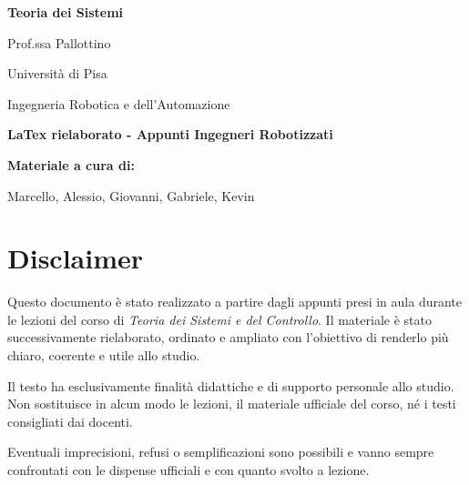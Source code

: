 \documentclass[a4paper,12pt]{report}
\theoremstyle{definition}
\begin{document}
\begin{titlepage}
    \centering
    \vspace*{2cm}

    {\Huge\bfseries Teoria dei Sistemi \par}
    \vspace{0.8cm}

    {\Large Prof.ssa Pallottino \par}
    \vspace{0.5cm}

    {\large Università di Pisa\par}
    \vspace{0.3cm}

    {\large Ingegneria Robotica e dell'Automazione\par}

    \vfill

    {\Large\bfseries LaTex rielaborato - Appunti Ingegneri Robotizzati\par}
    \vspace{0.8cm}

    {\large\textbf{Materiale a cura di:}\par}
    \vspace{0.2cm}
    {\large Marcello, Alessio, Giovanni, Gabriele, Kevin\par}

    \vfill
\end{titlepage}

\chapter*{Disclaimer}

Questo documento è stato realizzato a partire dagli appunti presi in aula durante le lezioni del corso di \emph{Teoria dei Sistemi e del Controllo}.  
Il materiale è stato successivamente rielaborato, ordinato e ampliato con l'obiettivo di renderlo più chiaro, coerente e utile allo studio.

Il testo ha esclusivamente finalità didattiche e di supporto personale allo studio. Non sostituisce in alcun modo le lezioni, il materiale ufficiale del corso, né i testi consigliati dai docenti.

Eventuali imprecisioni, refusi o semplificazioni sono possibili e vanno sempre confrontati con le dispense ufficiali e con quanto svolto a lezione.
\end{document}
